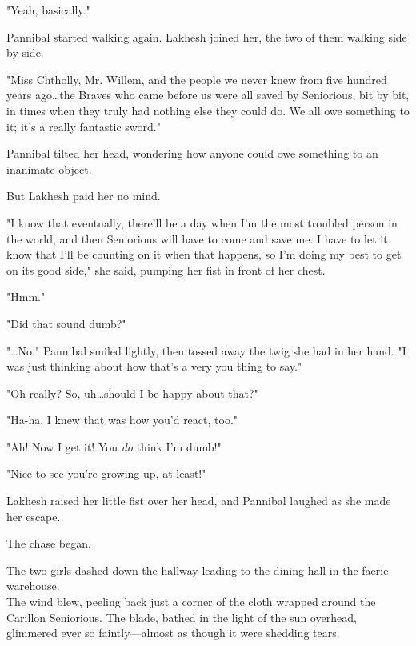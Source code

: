 "Yeah, basically."

Pannibal started walking again. Lakhesh joined her, the two of them walking side by side.

"Miss Chtholly, Mr. Willem, and the people we never knew from five hundred years ago…the Braves who came before us were all saved by Seniorious, bit by bit, in times when they truly had nothing else they could do. We all owe something to it; it's a really fantastic sword."

Pannibal tilted her head, wondering how anyone could owe something to an inanimate object.

But Lakhesh paid her no mind.

"I know that eventually, there'll be a day when I'm the most troubled person in the world, and then Seniorious will have to come and save me. I have to let it know that I'll be counting on it when that happens, so I'm doing my best to get on its good side," she said, pumping her fist in front of her chest.

"Hmm."

"Did that sound dumb?"

"…No." Pannibal smiled lightly, then tossed away the twig she had in her hand. "I was just thinking about how that's a very you thing to say."

"Oh really? So, uh…should I be happy about that?"

"Ha-ha, I knew that was how you'd react, too."

"Ah! Now I get it! You \textit{do} think I'm dumb!"

"Nice to see you're growing up, at least!"

Lakhesh raised her little fist over her head, and Pannibal laughed as she made her escape.

The chase began.

The two girls dashed down the hallway leading to the dining hall in the faerie warehouse.
\\

The wind blew, peeling back just a corner of the cloth wrapped around the Carillon Seniorious. The blade, bathed in the light of the sun overhead, glimmered ever so faintly—almost as though it were shedding tears.